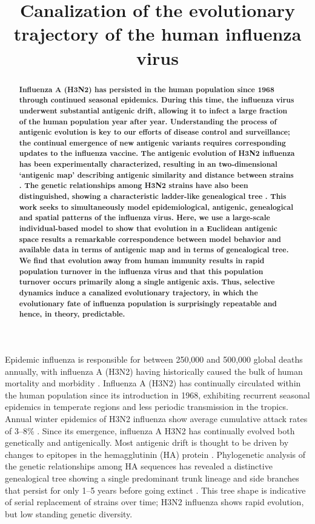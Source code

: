 \title{\Large \bf Canalization of the evolutionary trajectory of the human influenza virus}
\maketitle

\begin{abstract}
\noindent \bf Influenza A (H3N2) has persisted in the human population since 1968 through continued seasonal epidemics.  During this time, the influenza virus underwent substantial antigenic drift, allowing it to infect a large fraction of the human population year after year.  Understanding the process of antigenic evolution is key to our efforts of disease control and surveillance; the continual emergence of new antigenic variants requires corresponding updates to the influenza vaccine.  The antigenic evolution of H3N2 influenza has been experimentally characterized, resulting in an two-dimensional `antigenic map' describing antigenic similarity and distance between strains \cite{Smith04}.  The genetic relationships among H3N2 strains have also been distinguished, showing a characteristic ladder-like genealogical tree \cite{Fitch97}.  This work seeks to simultaneously model epidemiological, antigenic, genealogical and spatial patterns of the influenza virus.  Here, we use a large-scale individual-based model to show that evolution in a Euclidean antigenic space results a remarkable correspondence between model behavior and available data in terms of antigenic map and in terms of genealogical tree.  We find that evolution away from human immunity results in rapid population turnover in the influenza virus and that this population turnover occurs primarily along a single antigenic axis.  Thus, selective dynamics induce a canalized evolutionary trajectory, in which the evolutionary fate of influenza population is surprisingly repeatable and hence, in theory, predictable.
\end{abstract}

Epidemic influenza is responsible for between 250,000 and 500,000 global deaths annually, with influenza A (H3N2) having historically caused the bulk of human mortality and morbidity \cite{flufactsheet}.  Influenza A (H3N2) has continually circulated within the human population since its introduction in 1968, exhibiting recurrent seasonal epidemics in temperate regions and less periodic transmission in the tropics.  Annual winter epidemics of H3N2 influenza show average cumulative attack rates of 3--8\% \cite{Monto93,Koelle09}.  Since its emergence, influenza A H3N2 has continually evolved both genetically and antigenically.  Most antigenic drift is thought to be driven by changes to epitopes in the hemagglutinin (HA) protein \cite{Nelson07NatRevGenet}.  Phylogenetic analysis of the genetic relationships among HA sequences has revealed a distinctive genealogical tree showing a single predominant trunk lineage and side branches that persist for only 1--5 years before going extinct \cite{Fitch97}.  This tree shape is indicative of serial replacement of strains over time; H3N2 influenza shows rapid evolution, but low standing genetic diversity.

